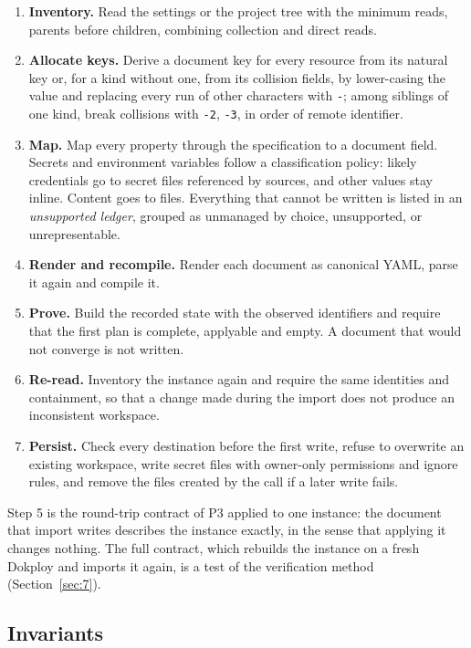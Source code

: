 \begin{enumerate}
\def\labelenumi{\arabic{enumi}.}
\item
  \textbf{Inventory.} Read the settings or the project tree with the minimum reads, parents before
  children, combining collection and direct reads.
\item
  \textbf{Allocate keys.} Derive a document key for every resource from its natural key or, for a kind
  without one, from its collision fields, by lower-casing the value and replacing every run of other
  characters with \texttt{-}; among siblings of one kind, break collisions with \texttt{-2}, \texttt{-3}, in order of
  remote identifier.
\item
  \textbf{Map.} Map every property through the specification to a document field. Secrets and environment
  variables follow a classification policy: likely credentials go to secret files referenced by
  sources, and other values stay inline. Content goes to files. Everything that cannot be written is
  listed in an \emph{unsupported ledger}, grouped as unmanaged by choice, unsupported, or unrepresentable.
\item
  \textbf{Render and recompile.} Render each document as canonical YAML, parse it again and compile it.
\item
  \textbf{Prove.} Build the recorded state with the observed identifiers and require that the first plan
  is complete, applyable and empty. A document that would not converge is not written.
\item
  \textbf{Re-read.} Inventory the instance again and require the same identities and containment, so that
  a change made during the import does not produce an inconsistent workspace.
\item
  \textbf{Persist.} Check every destination before the first write, refuse to overwrite an existing
  workspace, write secret files with owner-only permissions and ignore rules, and remove the files
  created by the call if a later write fails.
\end{enumerate}

Step 5 is the round-trip contract of P3 applied to one instance: the document that import writes
describes the instance exactly, in the sense that applying it changes nothing. The full contract,
which rebuilds the instance on a fresh Dokploy and imports it again, is a test of the verification
method (Section~\ref{sec:7}).

\subsection{Invariants}\label{sec:6.5}

